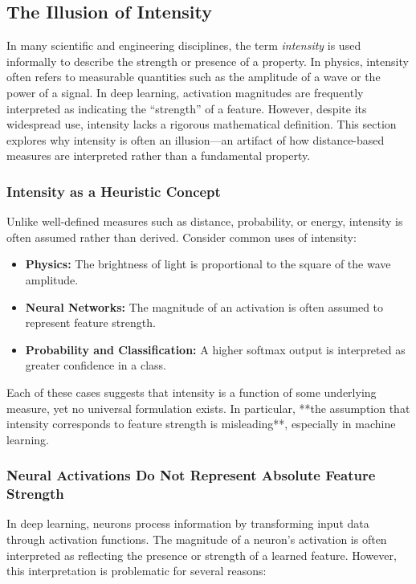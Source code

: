 \subsection{The Illusion of Intensity}

In many scientific and engineering disciplines, the term \textit{intensity} is used informally to describe the strength or presence of a property. In physics, intensity often refers to measurable quantities such as the amplitude of a wave or the power of a signal. In deep learning, activation magnitudes are frequently interpreted as indicating the “strength” of a feature. However, despite its widespread use, intensity lacks a rigorous mathematical definition. This section explores why intensity is often an illusion—an artifact of how distance-based measures are interpreted rather than a fundamental property.

\subsubsection{Intensity as a Heuristic Concept}

Unlike well-defined measures such as distance, probability, or energy, intensity is often assumed rather than derived. Consider common uses of intensity:

\begin{itemize}
    \item \textbf{Physics:} The brightness of light is proportional to the square of the wave amplitude.
    \item \textbf{Neural Networks:} The magnitude of an activation is often assumed to represent feature strength.
    \item \textbf{Probability and Classification:} A higher softmax output is interpreted as greater confidence in a class.
\end{itemize}

Each of these cases suggests that intensity is a function of some underlying measure, yet no universal formulation exists. In particular, **the assumption that intensity corresponds to feature strength is misleading**, especially in machine learning.

\subsubsection{Neural Activations Do Not Represent Absolute Feature Strength}

In deep learning, neurons process information by transforming input data through activation functions. The magnitude of a neuron’s activation is often interpreted as reflecting the presence or strength of a learned feature. However, this interpretation is problematic for several reasons:

